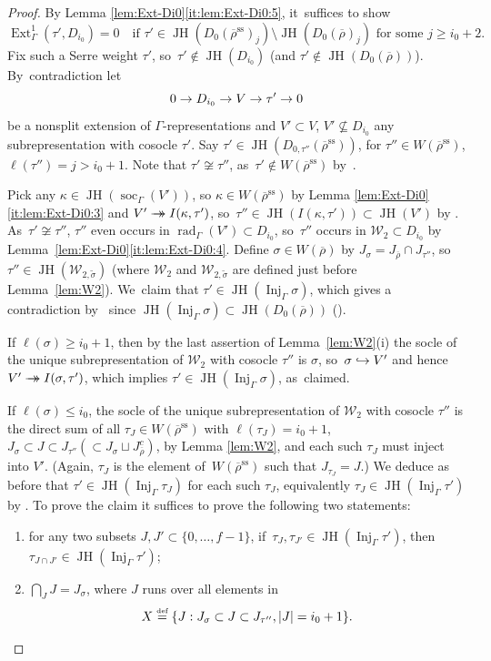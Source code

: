 \documentclass[JEP,XML,SOM,Unicode,NoFloatCountersInSection, NoEqCountersInSection,published]{cedram}
\newenvironment{enumeratea}
{\bgroup\def\theenumi{\alph{enumi}}\begin{enumerate}}
{\end{enumerate}\egroup}
\newcommand\hto{\mathrel{\lhook\joinrel\to}}
\newcommand{\onto}{\mathchoice{\to\hspace*{-5mm}\to}{\mathrel{\hbox{$\to\hspace*{-2.85mm}\to$}}}{\to\hspace*{-3mm}\to}{\to\hspace*{-3mm}\to}}
\let\backslash\setminus
\let\wt\widetilde
\renewcommand{\theenumi}{\roman{enumi}}
\newcommand{\defeq}{\stackrel{\textrm{\tiny{\upshape{def}}}}{=}}
\newcommand{\cW}{\mathcal{W}}
\renewcommand{\ss}{\mathrm{ss}}
\newcommand{\rhobar}{\overline{\rho}}
\newcommand{\brho}{\overline{\rho}}
\DeclareMathOperator{\Ext}{Ext}
\DeclareMathOperator{\Inj}{Inj}
\DeclareMathOperator{\JH}{\mathrm{JH}}
\DeclareMathOperator{\rad}{rad}
\DeclareMathOperator{\soc}{soc}
\theoremstyle{plain}
\theoremstyle{definition}
\begin{document}
\begin{proof}
By Lemma \ref{lem:Ext-Di0}\eqref{it:lem:Ext-Di0:5}, it~suffices to show
\[
\Ext^1_{\Gamma}(\tau',D_{i_0})=0\quad \text{if }\tau'\in \JH(D_{0}(\brho^\ss)_j)\backslash \JH(D_0(\brho)_j)\text{ for some }j\geq i_0+2.
\]
Fix such a Serre weight $\tau'$, so~$\tau' \notin \JH(D_{i_0})$ (and $\tau' \notin \JH(D_0(\rhobar))$). By~contradiction let
\[
0\to D_{i_0}\to V\to \tau'\rightarrow0
\]
be a nonsplit extension of $\Gamma$-representations and $V'\subset V$, $V'\nsubseteq D_{i_0}$ any subrepresentation with cosocle $\tau'$.
Say $\tau' \in \JH(D_{0,\tau''}(\brho^\ss))$, for $\tau'' \in W(\brho^\ss)$, $\ell(\tau'') = j > i_0+1$.
Note that $\tau' \not\cong \tau''$, as~$\tau' \notin W(\brho^\ss)$ by~\cite[Eq.\,(66)]{BHHMS4}.

Pick any $\kappa \in \JH(\soc_{\Gamma}(V'))$,
so $\kappa \in W(\brho^\ss)$ by Lemma \ref{lem:Ext-Di0}\eqref{it:lem:Ext-Di0:3} and $V' \onto I(\kappa,\tau')$, so~$\tau'' \in \JH(I(\kappa,\tau')) \subset \JH(V')$ by \cite[Lem.\,12.8(ii)]{BP}. As~$\tau' \not\cong \tau''$, $\tau''$ even occurs in $\rad_{\Gamma}(V') \subset D_{i_0}$, so~$\tau''$ occurs in $\cW_2 \subset D_{i_0}$ by Lemma~\ref{lem:Ext-Di0}\eqref{it:lem:Ext-Di0:4}.
Define $\sigma \in W(\brho)$ by $J_\sigma = J_{\brho} \cap J_{\tau''}$, so~$\tau'' \in \JH(\cW_{2,\wt\sigma})$ (where $\cW_2$ and $\cW_{2,\wt\sigma}$ are defined just before Lemma~\ref{lem:W2}). We~claim that $\tau' \in \JH(\Inj_\Gamma \sigma)$, which gives a contradiction by~\cite[Eq.\,(67)]{BHHMS4} since $\JH(\Inj_\Gamma \sigma) \subset \JH(D_0(\brho))$ (\cf \cite[Eq.\,(54)]{BHHMS4}).

If $\ell(\sigma) \ge i_0+1$, then by the last assertion of Lemma~\ref{lem:W2}(i) the socle of the unique subrepresentation of $\cW_2$ with cosocle $\tau''$ is $\sigma$, so~$\sigma \hto V'$ and hence $V' \onto I(\sigma,\tau')$, which implies $\tau' \in \JH(\Inj_\Gamma \sigma)$, as~claimed.

If $\ell(\sigma)\leq i_0$, the socle of the unique subrepresentation of $\cW_2$ with cosocle $\tau''$ is the direct sum of all $\tau_J \in W(\brho^\ss)$ with $\ell(\tau_J) = i_0+1$, $J_\sigma \subset J \subset J_{\tau''} (\subset J_\sigma \sqcup J_{\brho}^c)$, by Lemma \ref{lem:W2}, and each such $\tau_J$ must inject into $V'$.
(Again, $\tau_J$ is the element of~$W(\brho^\ss)$ such that $J_{\tau_J} = J$.)
We deduce as before that $\tau' \in \JH(\Inj_\Gamma \tau_J)$ for each such $\tau_J$, equivalently $\tau_J\in\JH(\Inj_\Gamma\tau')$ by \cite[Lem.\,3.2]{BP}.
To prove the claim it suffices to prove the following two statements:
\begin{enumeratea}
\item\label{enum:a}
for any two subsets $J,J'\subset \{0,\dots,f-1\}$, if~$\tau_J,\tau_{J'}\in \JH(\Inj_\Gamma\tau')$, then $\tau_{J\cap J'}\in \JH(\Inj_\Gamma\tau')$;
\item\label{enum:b}
$\bigcap_J J=J_\sigma$, where $J$ runs over all elements in
\[
X\defeq\{J: J_\sigma\subset J\subset J_{\tau''}, |J|=i_0+1\}.
\]
\end{enumeratea}


\end{proof}
\end{document}

